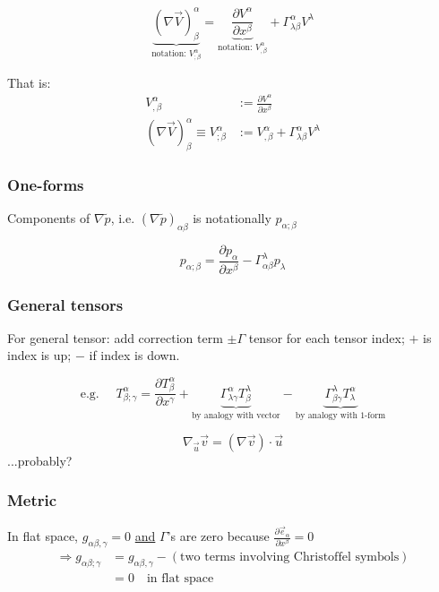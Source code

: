 \documentclass[a4paper]{article} %
\renewcommand{\tilde}{\widetilde}
\begin{document}
\begin{equation}
\underbrace{(\nabla \vec{V})^{\alpha}_{\beta}}_{\text{notation: }V^{\alpha}_{;\beta}}=
\underbrace{\frac{\partial V^{\alpha}}{\partial x^{\beta}}}_{\text{notation: }V^{\alpha}_{,\beta}}
+\Gamma^{\alpha}_{\lambda\beta}V^{\lambda}
\end{equation}

That is:
\begin{align}
V^{\alpha}_{,\beta}&:=\frac{\partial V^{\alpha}}{\partial x^{\beta}}\\
(\nabla \vec{V})^{\alpha}_{\beta}\equiv V^{\alpha}_{;\beta}&:=V^{\alpha}_{,\beta}+\Gamma^{\alpha}_{\lambda\beta}V^{\lambda}
\end{align}

\subsubsection{One-forms}
Components of $\nabla\tilde{p}$, i.e. $(\nabla\tilde{p})_{\alpha\beta}$ is notationally $p_{\alpha;\beta}$

\begin{equation}
p_{\alpha;\beta}=\frac{\partial p_{\alpha}}{\partial x^{\beta}}-\Gamma^{\lambda}_{\alpha\beta} p_{\lambda}
\end{equation}

\subsubsection{General tensors}
For general tensor: add correction term $\pm \Gamma$ tensor for each tensor index; $+$ is index is up; $-$ if index is down.

\begin{equation}
\text{e.g. }\quad T^{\alpha}_{\beta;\gamma}=\frac{\partial T^{\alpha}_{\beta}}{\partial x^{\gamma}}
+\underbrace{\Gamma^{\alpha}_{\lambda\gamma} T^{\lambda}_{\beta}}_{\text{by analogy with vector}}
-\underbrace{\Gamma^{\lambda}_{\beta \gamma}T^{\alpha}_{\lambda}}_{\text{by analogy with 1-form}}
\end{equation}

\begin{equation}
\nabla_{\vec{u}}\vec{v}=(\nabla\vec{v})\cdot \vec{u}
\end{equation}
...probably?


\subsubsection{Metric}
In flat space, $g_{\alpha\beta , \gamma}=0$ \underline{and} $\Gamma$'s are zero because $\frac{\partial\vec{e}_{\alpha}}{\partial x^{\beta}}=0$
\begin{align}
\Rightarrow g_{\alpha\beta;\gamma}&=g_{\alpha\beta,\gamma}-(\text{two terms involving Christoffel symbols})\\
&=0 \quad\text{in flat space}
\end{align}

\end{document}
